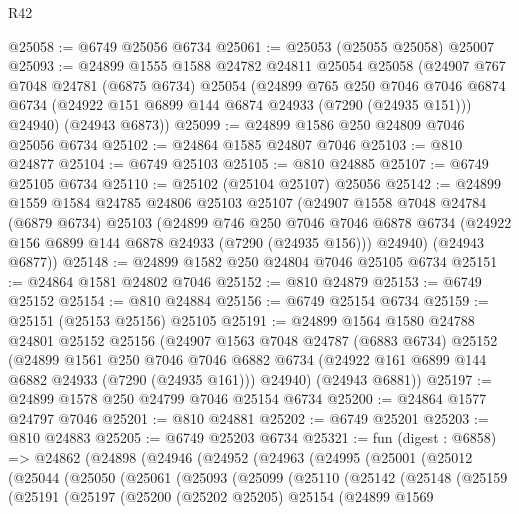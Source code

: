 \begin{lexlean}{R42}
\begin{coremodule}
{@25058 := @6749 @25056 @6734
@25061 := @25053 (@25055 @25058) @25007
@25093 := @24899
    @1555
    @1588
    @24782
    @24811
    @25054
    @25058
    (@24907
      @767
      @7048
      @24781
      (@6875 @6734)
      @25054
      (@24899
        @765
        @250
        @7046
        @7046
        @6874
        @6734
        (@24922 @151 @6899 @144 @6874 @24933 (@7290 (@24935 @151)))
        @24940)
      (@24943 @6873))
@25099 := @24899 @1586 @250 @24809 @7046 @25056 @6734
@25102 := @24864 @1585 @24807 @7046
@25103 := @810 @24877
@25104 := @6749 @25103
@25105 := @810 @24885
@25107 := @6749 @25105 @6734
@25110 := @25102 (@25104 @25107) @25056
@25142 := @24899
    @1559
    @1584
    @24785
    @24806
    @25103
    @25107
    (@24907
      @1558
      @7048
      @24784
      (@6879 @6734)
      @25103
      (@24899
        @746
        @250
        @7046
        @7046
        @6878
        @6734
        (@24922 @156 @6899 @144 @6878 @24933 (@7290 (@24935 @156)))
        @24940)
      (@24943 @6877))
@25148 := @24899 @1582 @250 @24804 @7046 @25105 @6734
@25151 := @24864 @1581 @24802 @7046
@25152 := @810 @24879
@25153 := @6749 @25152
@25154 := @810 @24884
@25156 := @6749 @25154 @6734
@25159 := @25151 (@25153 @25156) @25105
@25191 := @24899
    @1564
    @1580
    @24788
    @24801
    @25152
    @25156
    (@24907
      @1563
      @7048
      @24787
      (@6883 @6734)
      @25152
      (@24899
        @1561
        @250
        @7046
        @7046
        @6882
        @6734
        (@24922 @161 @6899 @144 @6882 @24933 (@7290 (@24935 @161)))
        @24940)
      (@24943 @6881))
@25197 := @24899 @1578 @250 @24799 @7046 @25154 @6734
@25200 := @24864 @1577 @24797 @7046
@25201 := @810 @24881
@25202 := @6749 @25201
@25203 := @810 @24883
@25205 := @6749 @25203 @6734
@25321 := fun (digest : @6858) =>
  @24862
    (@24898
      (@24946
        (@24952
          (@24963
            (@24995
              (@25001
                (@25012
                  (@25044
                    (@25050
                      (@25061
                        (@25093
                          (@25099
                            (@25110
                              (@25142
                                (@25148
                                  (@25159
                                    (@25191
                                      (@25197
                                        (@25200
                                          (@25202 @25205)
                                          @25154
                                          (@24899
                                            @1569
}
\end{coremodule}
\end{lexlean}
